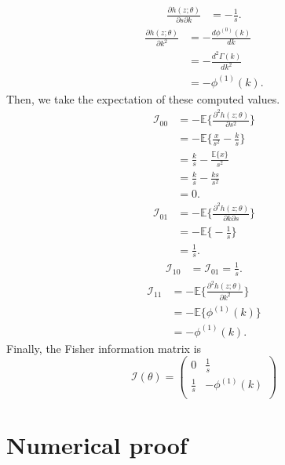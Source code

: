 \documentclass[final]{aomart}
\newtheorem[{}\it]{thm}{Theorem}[section]
\theoremstyle{definition}
\newtheorem*[{}\it]{notation}{Notation}
\numberwithin{equation}{section}
\newcommand{\fisher}{\mathcal{I}} %
\begin{document}
\begin{equation}
	\begin{aligned}
	\frac{\partial h(z; \theta)}{\partial s \partial k} & = -\frac{1}{s}.
	\end{aligned}
	\label{10}
\end{equation}
\begin{equation}
	\begin{aligned}
	\frac{\partial h(z; \theta)}{\partial k^2} & = -\frac{d\phi^{(0)}(k)}{dk}\\
															   & = -\frac{d^2\Gamma(k)}{dk^2}\\
															   & = -\phi^{(1)}(k).
	\end{aligned}
	\label{11}
\end{equation}
Then, we take the expectation of these computed values.
\begin{equation}
	\begin{aligned}
	\fisher_{00} & = -\mathbb{E}\bigg\{ \frac{\partial^2 h(z;\theta)}{\partial s^2} \bigg\}\\
					   & = -\mathbb{E}\bigg\{ \frac{x}{s^2} - \frac{k}{s} \bigg\}\\
					   & = \frac{k}{s} - \frac{\mathbb{E}\{ x \}}{s^2}\\
					   & = \frac{k}{s} - \frac{ks}{s^2}\\
					   & = 0.
	\end{aligned}
\end{equation}
\begin{equation}
	\begin{aligned}
	\fisher_{01} & = -\mathbb{E}\bigg\{ \frac{\partial^2 h(z;\theta)}{\partial k\partial s} \bigg\}\\
					  & = -\mathbb{E}\bigg\{ -\frac{1}{s} \bigg\}\\
					  & = \frac{1}{s}.
	\end{aligned}
\end{equation}
\begin{equation}
	\begin{aligned}
	\fisher_{10} & = \fisher_{01} = \frac{1}{s}.
	\end{aligned}
\end{equation}
\begin{equation}
	\begin{aligned}
	\fisher_{11} & = -\mathbb{E}\bigg\{ \frac{\partial^2 h(z;\theta)}{\partial k^2} \bigg\}\\
					  & = -\mathbb{E}\bigg\{ \phi^{(1)}(k) \bigg\}\\
					  & = -\phi^{(1)}(k).
	\end{aligned}
\end{equation}
Finally, the Fisher information matrix is 
\[ \fisher(\theta) = \left( \begin{array}{cc}
	0 & \frac{1}{s} \\
	\frac{1}{s} & -\phi^{(1)}(k) \\
	 \end{array} \right)\] 
\section{Numerical proof}


\end{document}
